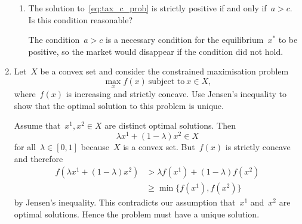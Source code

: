 \begin{enumerate}
\begin{enumerate}
		\item
		The solution to~\eqref{eq:tax_c_prob} is strictly positive if and only if~$a>c$.
		Is this condition reasonable?
		\begin{solution}
			The condition~$a>c$ is a necessary condition for the equilibrium~$x^*$ to be positive, so the market would disappear if the condition did not hold.
		\end{solution}

	\end{enumerate}

	\item
	Let~$X$ be a convex set and consider the constrained maximisation problem
	\[ \max_xf(x)\ \text{subject to}\ x\in X, \]
	where~$f(x)$ is increasing and strictly concave.
	Use Jensen's inequality to show that the optimal solution to this problem is unique.
	\begin{solution}
		Assume that~$x^1,x^2\in X$ are distinct optimal solutions.
		Then
		\[ \lambda x^1+(1-\lambda)x^2\in X\]
		for all~$\lambda\in[0,1]$ because~$X$ is a convex set.
		But~$f(x)$ is strictly concave and therefore
		\begin{align}
			f(\lambda x^1+(1-\lambda)x^2)
			&> \lambda f(x^1)+(1-\lambda)f(x^2)\\
			&\ge \min\{f(x^1),f(x^2)\}
		\end{align}
		by Jensen's inequality.
		This contradicts our assumption that~$x^1$ and~$x^2$ are optimal solutions.
		Hence the problem must have a unique solution.
	\end{solution}

\end{enumerate}
